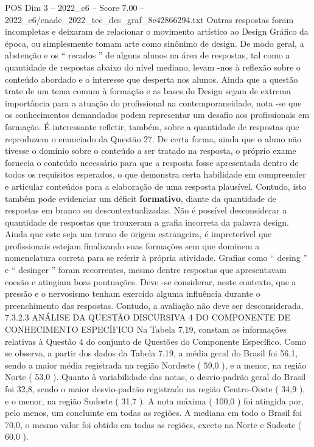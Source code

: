 \begin{textsample}{POS Dim 3 – 2022\_c6 – Score 7.00 – 2022\_c6/enade\_2022\_tec\_des\_graf\_8c42866294.txt}
Outras respostas foram incompletas e deixaram de relacionar o movimento artístico ao Design Gráfico da época, ou simplesmente tomam arte como sinônimo de design.
De modo geral, a abstenção e os “ recados ” de alguns alunos na área de respostas, tal como a quantidade de respostas abaixo do nível mediano, levam -nos à reflexão sobre o conteúdo abordado e o interesse que desperta nos alunos.
Ainda que a questão trate de um tema comum à formação e as bases do Design sejam de extrema importância para a atuação do profissional na contemporaneidade, nota -se que os conhecimentos demandados podem representar um desafio aos profissionais em formação.
É interessante refletir, também, sobre a quantidade de respostas que reproduzem o enunciado da Questão 27.
De certa forma, ainda que o aluno não tivesse o domínio sobre o conteúdo a ser tratado na resposta, o próprio exame fornecia o conteúdo necessário para que a resposta fosse apresentada dentro de todos os requisitos esperados, o que demonstra certa habilidade em compreender e articular conteúdos para a elaboração de uma resposta plausível.
Contudo, isto também pode evidenciar um déficit \textbf{formativo}, diante da quantidade de respostas em branco ou descontextualizadas.
Não é possível desconsiderar a quantidade de respostas que trouxeram a grafia incorreta da palavra design.
Ainda que este seja um termo de origem estrangeira, é impreterível que profissionais estejam finalizando suas formações sem que dominem a nomenclatura correta para se referir à própria atividade.
Grafias como “ desing ” e “ desinger ” foram recorrentes, mesmo dentre respostas que apresentavam coesão e atingiam boas pontuações.
Deve -se considerar, neste contexto, que a pressão e o nervosismo tenham exercido alguma influência durante o preenchimento das respostas.
Contudo, a avaliação não deve ser desconsiderada. 7.3.2.3 ANÁLISE DA QUESTÃO DISCURSIVA 4 DO COMPONENTE DE CONHECIMENTO ESPECÍFICO Na Tabela 7.19, constam as informações relativas à Questão 4 do conjunto de Questões do Componente Específico.
Como se observa, a partir dos dados da Tabela 7.19, a média geral do Brasil foi 56,1, sendo a maior média registrada na região Nordeste ( 59,0 ), e a menor, na região Norte ( 53,0 ).
Quanto à variabilidade das notas, o desvio-padrão geral do Brasil foi 32,8, sendo o maior desvio-padrão registrado na região Centro-Oeste ( 34,9 ), e o menor, na região Sudeste ( 31,7 ).
A nota máxima ( 100,0 ) foi atingida por, pelo menos, um concluinte em todas as regiões.
A mediana em todo o Brasil foi 70,0, o mesmo valor foi obtido em todas as regiões, exceto na Norte e Sudeste ( 60,0 ).

\end{textsample}
